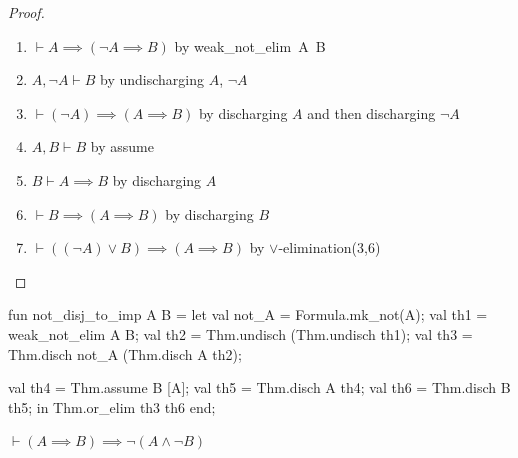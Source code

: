 \begin{proof}
\begin{enumerate}
\item $\vdash A\implies(\neg A\implies B)$ by {\Tt{}weak{\_}not{\_}elim\ A\ B\nwendquote}
\item $A,\neg A\vdash B$ by undischarging $A$, $\neg A$
\item $\vdash(\neg A)\implies(A\implies B)$ by discharging $A$ and
  then discharging $\neg A$
\item $A,B\vdash B$ by assume
\item $B\vdash A\implies B$ by discharging $A$
\item $\vdash B\implies(A\implies B)$ by discharging $B$
\item $\vdash((\neg A)\lor B)\implies(A\implies B)$ by $\lor$-elimination(3,6)
\qedhere
\end{enumerate}
\end{proof}

\nwenddocs{}\endmoddef\nwstartdeflinemarkup{}\nwenddeflinemarkup
fun not_disj_to_imp A B =
  let
    val not_A = Formula.mk_not(A);
    val th1 = weak_not_elim A B;
    val th2 = Thm.undisch (Thm.undisch th1);
    val th3 = Thm.disch not_A (Thm.disch A th2);

    val th4 = Thm.assume B [A];
    val th5 = Thm.disch A th4;
    val th6 = Thm.disch B th5;
  in
    Thm.or_elim th3 th6
  end;
\eatline
{}\nwendcode{}\nwdocspar
\begin{node}
$\vdash(A\implies B)\implies\neg(A\land\neg B)$
\end{node}

